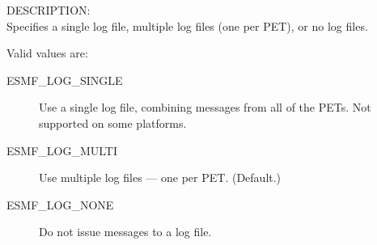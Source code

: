\label{opt:logtype}
{\sf DESCRIPTION:\\}
Specifies a single log file, multiple log files (one per PET), or no log files.

Valid values are:
\begin{description}
   \item [ESMF\_LOG\_SINGLE] 
         Use a single log file, combining messages from all of the PETs.  Not supported on some platforms.
   \item [ESMF\_LOG\_MULTI]
         Use multiple log files --- one per PET.  (Default.)
   \item [ESMF\_LOG\_NONE]
         Do not issue messages to a log file.
\end{description}





